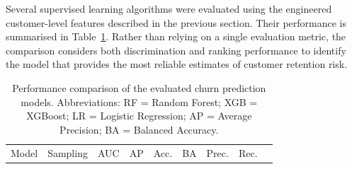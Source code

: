 \documentclass[
  12pt,
  letterpaper,
]{book}
\begin{document}
Several supervised learning algorithms were evaluated using the
engineered customer-level features described in the previous section.
Their performance is summarised in
Table~\ref{tbl-churn-model-comparison}. Rather than relying on a single
evaluation metric, the comparison considers both discrimination and
ranking performance to identify the model that provides the most
reliable estimates of customer retention risk.

\begin{longtable}[]{@{}
  >{\raggedright\arraybackslash}p{}
  >{\centering\arraybackslash}p{}
  >{\centering\arraybackslash}p{}
  >{\centering\arraybackslash}p{}
  >{\centering\arraybackslash}p{}
  >{\centering\arraybackslash}p{}
  >{\centering\arraybackslash}p{}
  >{\centering\arraybackslash}p{}
  >{\centering\arraybackslash}p{}@{}}
\caption{Performance comparison of the evaluated churn prediction
models. Abbreviations: RF = Random Forest; XGB = XGBoost; LR = Logistic
Regression; AP = Average Precision; BA = Balanced
Accuracy.}\label{tbl-churn-model-comparison}\tabularnewline
\toprule\noalign{}
\begin{minipage}[b]{\linewidth}\raggedright
Model
\end{minipage} & \begin{minipage}[b]{\linewidth}\centering
Sampling
\end{minipage} & \begin{minipage}[b]{\linewidth}\centering
AUC
\end{minipage} & \begin{minipage}[b]{\linewidth}\centering
AP
\end{minipage} & \begin{minipage}[b]{\linewidth}\centering
Acc.
\end{minipage} & \begin{minipage}[b]{\linewidth}\centering
BA
\end{minipage} & \begin{minipage}[b]{\linewidth}\centering
Prec.
\end{minipage} & \begin{minipage}[b]{\linewidth}\centering
Rec.
\end{minipage} & \begin{minipage}[b]{\linewidth}\centering

\end{minipage}
\end{longtable}
\end{document}
